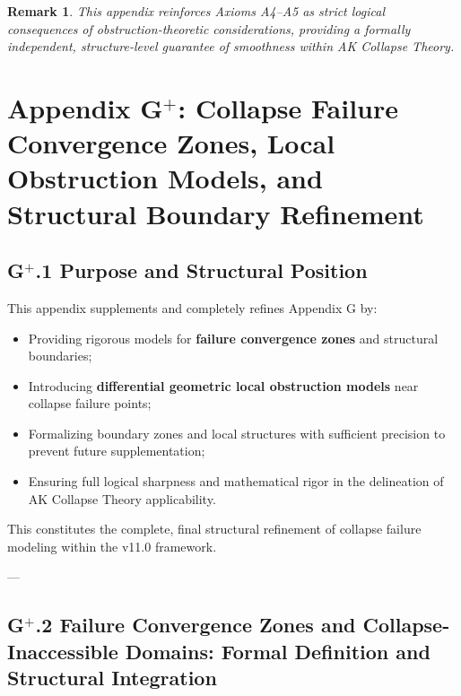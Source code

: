 \documentclass[11pt]{article}
\newtheorem{remark}[theorem]{Remark}
\begin{document}
\begin{remark}
This appendix reinforces Axioms A4–A5 as strict logical consequences of obstruction-theoretic considerations, providing a formally independent, structure-level guarantee of smoothness within AK Collapse Theory.
\end{remark}




\section*{Appendix G$^{+}$: Collapse Failure Convergence Zones, Local Obstruction Models, and Structural Boundary Refinement}

\subsection*{G$^{+}$.1 Purpose and Structural Position}

This appendix supplements and completely refines Appendix G by:

\begin{itemize}
    \item Providing rigorous models for \textbf{failure convergence zones} and structural boundaries;
    \item Introducing \textbf{differential geometric local obstruction models} near collapse failure points;
    \item Formalizing boundary zones and local structures with sufficient precision to prevent future supplementation;
    \item Ensuring full logical sharpness and mathematical rigor in the delineation of AK Collapse Theory applicability.
\end{itemize}

This constitutes the complete, final structural refinement of collapse failure modeling within the v11.0 framework.

---

\subsection*{G$^{+}$.2 Failure Convergence Zones and Collapse-Inaccessible Domains: Formal Definition and Structural Integration}
\end{document}
